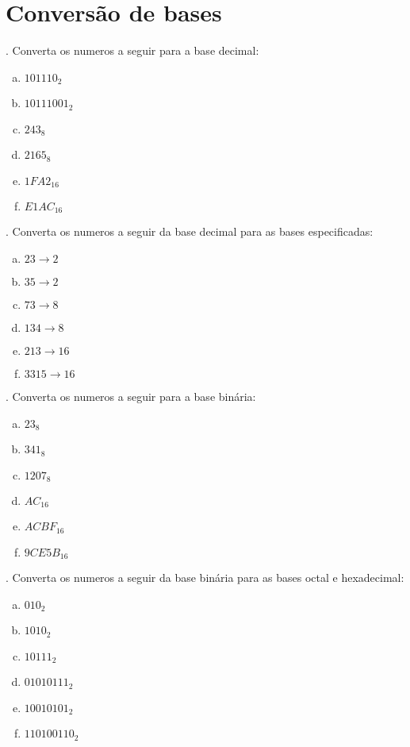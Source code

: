 \section*{Conversão de bases}

\begin{minipage}[h]{.5\linewidth}
. Converta os numeros a seguir para a base decimal:
\begin{enumerate}[a)]
\item $101110_2$ %
\item $10111001_2$ %
\item $243_8$ %
\item $2165_8$ %
\item $1FA2_{16}$ %
\item $E1AC_{16}$ %
\end{enumerate}
\end{minipage}
\begin{minipage}[h]{.5\linewidth}
. Converta os numeros a seguir da base decimal para as bases especificadas:
\begin{enumerate}[a)]
\item $23\rightarrow 2$ %
\item $35\rightarrow 2$ %
\item $73\rightarrow 8$ %
\item $134\rightarrow 8$ %
\item $213\rightarrow 16$ %
\item $3315\rightarrow 16$ %
\end{enumerate}
\end{minipage}

\bigskip\noindent\begin{minipage}[h]{.5\linewidth}
. Converta os numeros a seguir para a base binária:
\begin{enumerate}[a)]
\item $23_8$ %
\item $341_8$ %
\item $1207_8$ %
\item $AC_{16}$ %
\item $ACBF_{16}$ %
\item $9CE5B_{16}$ %
\end{enumerate}
\end{minipage}
\begin{minipage}[h]{.5\linewidth}
. Converta os numeros a seguir da base binária para as bases octal e hexadecimal:
\begin{enumerate}[a)]
\item $010_2$ %
\item $1010_2$ %
\item $10111_2$ %
\item $01010111_2$ %
\item $10010101_2$ %
\item $110100110_2$ %
\end{enumerate}
\end{minipage}

